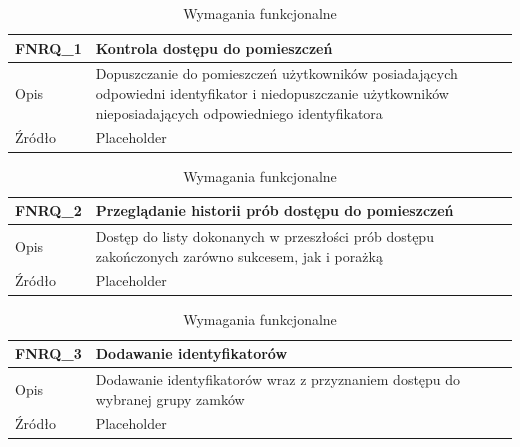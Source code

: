         \begin{table}[h!]
            \caption{Wymagania funkcjonalne}
            \centering
            \begin{subtable}[c]{\textwidth}
                \centering
                \begin{tabular}{|p{2cm}|p{10cm}|}
                    \hline FNRQ\_1      & Kontrola dostępu do pomieszczeń  \\
                    \hline Opis         & Dopuszczanie do pomieszczeń użytkowników posiadających odpowiedni identyfikator i niedopuszczanie użytkowników nieposiadających odpowiedniego identyfikatora  \\
                    \hline Źródło       & Placeholder    \\
                    \hline
                \end{tabular}
                \label{tbl:fnrq1}
                \vspace{10mm}           
            \end{subtable}
        \quad%
            \begin{subtable}[c]{\textwidth}
                \centering
                 \begin{tabular}{|p{2cm}|p{10cm}|}
                    \hline FNRQ\_2      & Przeglądanie historii prób dostępu do pomieszczeń  \\
                    \hline Opis         & Dostęp do listy dokonanych w przeszłości prób dostępu zakończonych zarówno sukcesem, jak i porażką \\
                    \hline Źródło       & Placeholder    \\
                    \hline
                \end{tabular}
                \label{tbl:fnrq2}
                \vspace{10mm}           
            \end{subtable}
        \quad%
            \begin{subtable}[c]{\textwidth}
                \centering
                 \begin{tabular}{|p{2cm}|p{10cm}|}
                    \hline FNRQ\_3      & Dodawanie identyfikatorów  \\
                    \hline Opis         & Dodawanie identyfikatorów wraz z przyznaniem dostępu do wybranej grupy zamków \\
                    \hline Źródło       & Placeholder    \\
                    \hline

\end{tabular}
\end{subtable}
\end{table}
